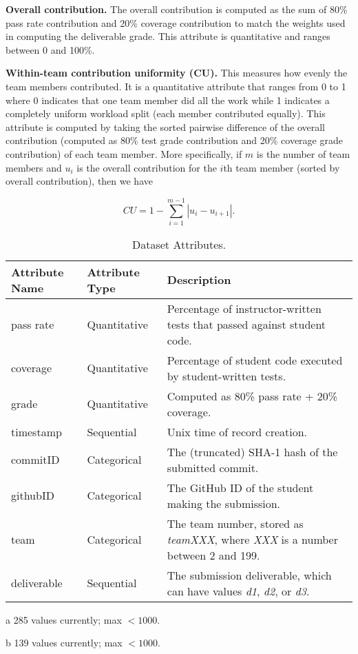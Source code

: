 \documentclass[../manifest.tex]{subfiles}
\begin{document}
\textbf{Overall contribution.} The overall contribution is computed as the sum of 80\% pass rate contribution and 20\% coverage contribution to match the weights used in computing the deliverable grade. This attribute is quantitative and ranges between 0 and 100\%.

\textbf{Within-team contribution uniformity (CU).} This measures how evenly the team members contributed. It is a quantitative attribute that ranges from 0 to 1 where 0 indicates that one team member did all the work while 1 indicates a completely uniform workload split (each member contributed equally). This attribute is computed by taking the sorted pairwise difference of the overall contribution (computed as 80\% test grade contribution and 20\% coverage grade contribution) of each team member. More specifically, if $m$ is the number of team members and $u_i$ is the overall contribution for the $i$th team member (sorted by overall contribution), then we have

\begin{equation}
  \label{eq:con-uniform}
  CU = 1-\sum_{i=1}^{m-1} |u_i - u_{i+1}|.
\end{equation}


\begin{table*}[t]
  \label{tab:attributes}
  \centering
  \begin{threeparttable}
      \caption{Dataset Attributes.}
  \begin{tabular*}{\textwidth}{lll}
    \hline
    \textbf{Attribute Name} & \textbf{Attribute Type} & \textbf{Description} \\
    \hline
    pass rate     & Quantitative & Percentage of instructor-written tests that passed against student code. \\
    coverage  & Quantitative & Percentage of student code executed by student-written tests. \\
    grade     & Quantitative & Computed as 80\% pass rate + 20\% coverage. \\
    timestamp      & Sequential   & Unix time of record creation. \\
    commitID      & Categorical  & The (truncated) SHA-1 hash of the submitted commit. \\
    githubID      & Categorical\tnote{a}  & The GitHub ID of the student making the submission. \\
    team           & Categorical\tnote{b}  & The team number, stored as \textit{teamXXX}, where \textit{XXX} is a number between 2 and 199. \\
    deliverable    & Sequential   & The submission deliverable, which can have values \textit{d1}, \textit{d2}, or \textit{d3}. \\
    \hline
  \end{tabular*}
  \begin{tablenotes}\footnotesize
    \item [a] 285 values currently; max $<1000$.
    \item [b] 139 values currently; max $<1000$.
\end{tablenotes}
\end{threeparttable}
\end{table*}
\end{document}
